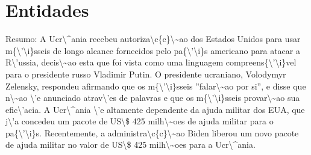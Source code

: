 \documentclass{article}%
\begin{document}
\section{Entidades}%
\label{sec:Entidades}%
Resumo:\newline%
A Ucr\textbackslash{}\^{}ania recebeu autoriza\textbackslash{}c\{c\}\textbackslash{}\textasciitilde{}ao dos Estados Unidos para usar m\{\textbackslash{}'\textbackslash{}i\}sseis de longo alcance fornecidos pelo pa\{\textbackslash{}'\textbackslash{}i\}s americano para atacar a R\textbackslash{}'ussia, decis\textbackslash{}\textasciitilde{}ao esta que foi vista como uma linguagem compreens\{\textbackslash{}'\textbackslash{}i\}vel para o presidente russo Vladimir Putin. O presidente ucraniano, Volodymyr Zelensky, respondeu afirmando que os m\{\textbackslash{}'\textbackslash{}i\}sseis ''falar\textbackslash{}\textasciitilde{}ao por si'', e disse que n\textbackslash{}\textasciitilde{}ao \textbackslash{}'e anunciado atrav\textbackslash{}'es de palavras e que os m\{\textbackslash{}'\textbackslash{}i\}sseis provar\textbackslash{}\textasciitilde{}ao sua efic\textbackslash{}'acia. A Ucr\textbackslash{}\^{}ania \textbackslash{}'e altamente dependente da ajuda militar dos EUA, que j\textbackslash{}'a concedeu um pacote de US\textbackslash{}\$ 425 milh\textbackslash{}\textasciitilde{}oes de ajuda militar para o pa\{\textbackslash{}'\textbackslash{}i\}s. Recentemente, a administra\textbackslash{}c\{c\}\textbackslash{}\textasciitilde{}ao Biden liberou um novo pacote de ajuda militar no valor de US\textbackslash{}\$ 425 milh\textbackslash{}\textasciitilde{}oes para a Ucr\textbackslash{}\^{}ania.

%
\end{document}

